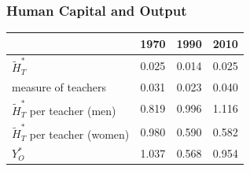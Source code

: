 \documentclass[11pt]{beamer}
\begin{document}
\begin{frame}
\frametitle{Human Capital and Output}

\begin{table}
  \centering \begin{tabular}{lccc}
\toprule
& 1970 & 1990 & 2010 \\
\midrule
$\widetilde{H}_T^*$ & 0.025  & 0.014 & 0.025 \\
measure of teachers & 0.031 & 0.023 & 0.040\\
$\widetilde{H}_T^*$ per teacher (men)   & 0.819 & 0.996 & 1.116 \\
$\widetilde{H}_T^*$ per teacher (women)   & 0.980 & 0.590 & 0.582 \\
$Y_O^*$ & 1.037 & 0.568 & 0.954 \\
\bottomrule
\end{tabular}
  \label{ }
\end{table}
\end{frame}

    

\end{document}
